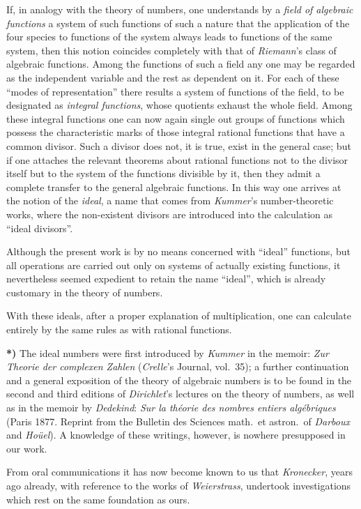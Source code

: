 \documentclass{article}
\begin{document}
If, in analogy with the theory of numbers, one understands by a \emph{field of algebraic functions} a system of such functions of such a nature that the application of the four species to functions of the system always leads to functions of the same system, then this notion coincides completely with that of \emph{Riemann}'s class of algebraic functions. Among the functions of such a field any one may be regarded as the independent variable and the rest as dependent on it. For each of these ``modes of representation'' there results a system of functions of the field, to be designated as \emph{integral functions}, whose quotients exhaust the whole field. Among these integral functions one can now again single out groups of functions which possess the characteristic marks of those integral rational functions that have a common divisor. Such a divisor does not, it is true, exist in the general case; but if one attaches the relevant theorems about rational functions not to the divisor itself but to the system of the functions divisible by it, then they admit a complete transfer to the general algebraic functions. In this way one arrives at the notion of the \emph{ideal}, a name that comes from \emph{Kummer}'s number-theoretic works, where the non-existent divisors are introduced into the calculation as ``ideal divisors''.

Although the present work is by no means concerned with ``ideal'' functions, but all operations are carried out only on systems of actually existing functions, it nevertheless seemed expedient to retain the name ``ideal'', which is already customary in the theory of numbers.

With these ideals, after a proper explanation of multiplication, one can calculate entirely by the same rules as with rational functions.

\textbf{*)} The ideal numbers were first introduced by \emph{Kummer} in the memoir: \emph{Zur Theorie der complexen Zahlen} (\emph{Crelle}'s Journal, vol.~35); a further continuation and a general exposition of the theory of algebraic numbers is to be found in the second and third editions of \emph{Dirichlet}'s lectures on the theory of numbers, as well as in the memoir by \emph{Dedekind}: \emph{Sur la théorie des nombres entiers algébriques} (Paris 1877. Reprint from the Bulletin des Sciences math.\ et astron.\ of \emph{Darboux} and \emph{Hoüel}). A knowledge of these writings, however, is nowhere presupposed in our work.

From oral communications it has now become known to us that \emph{Kronecker}, years ago already, with reference to the works of \emph{Weierstrass}, undertook investigations which rest on the same foundation as ours.
\end{document}
